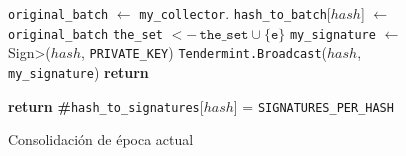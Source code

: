   \begin{figure}[t!]
  \begin{adjustbox}{minipage=[t]{\columnwidth}}
    \begin{algorithm}[H]
      \renewcommand{\thealgorithm}{ABCI Haschain - Parte 2}         
      \caption{\small Consolidación de época actual}%
      \label{alg:abci-hash2}%
      \small
      \begin{algorithmic}[1]
            	\label{alg:hash_revert}
                \State \texttt{original\_batch} $\leftarrow$ \texttt{my\_collector}.
					\State \texttt{hash\_to\_batch}[$hash$]  $\leftarrow$ \texttt{original\_batch} \label{line:abci-hashchain-hash-to-batch}
									\State \texttt{the\_set} \(<- \, \texttt{the\_set} \cup \{\texttt{e}\}\) \label{line:abci-hashchain-the-set}
								\EndIf
							\EndFor
                			\State \texttt{my\_signature} $\leftarrow$ \<Sign>($hash$, \texttt{PRIVATE\_KEY})
                			\State \texttt{Tendermint.Broadcast}($hash$, \texttt{my\_signature})
				\EndIf             	
                	\State \textbf{return}
            \EndFunction
            
             \label{alg:hash_consolidated}
            		\State \textbf{return} \textbf{\#}\texttt{hash\_to\_signatures}[$hash$] = \texttt{SIGNATURES\_PER\_HASH}
            \EndFunction

        \end{algorithmic}
      \end{algorithm}
	\end{adjustbox}
  \end{figure}
  